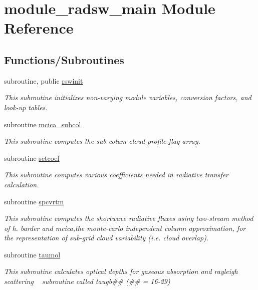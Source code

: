 \hypertarget{namespacemodule__radsw__main}{}\section{module\+\_\+radsw\+\_\+main Module Reference}
\label{namespacemodule__radsw__main}
\subsection*{Functions/\+Subroutines}
\begin{DoxyCompactItemize}
\item 
subroutine, public \hyperlink{group__module__radsw__main_ga9288a5da63d182f20c99e0044ca52f29}{rswinit}
\begin{DoxyCompactList}\small\item\em This subroutine initializes non-\/varying module variables, conversion factors, and look-\/up tables. \end{DoxyCompactList}\item 
subroutine \hyperlink{group__module__radsw__main_gae5916f7b0f63f7836a8ab80ce3933482}{mcica\+\_\+subcol}
\begin{DoxyCompactList}\small\item\em This subroutine computes the sub-\/colum cloud profile flag array. \end{DoxyCompactList}\item 
subroutine \hyperlink{group__module__radsw__main_gaaa580fe228ccc04abd54368c8df0f312}{setcoef}
\begin{DoxyCompactList}\small\item\em This subroutine computes various coefficients needed in radiative transfer calculation. \end{DoxyCompactList}\item 
subroutine \hyperlink{group__module__radsw__main_gae30ee993080f035f0e05cda7c7baffce}{spcvrtm}
\begin{DoxyCompactList}\small\item\em This subroutine computes the shortwave radiative fluxes using two-\/stream method of h. barder and mcica,the monte-\/carlo independent column approximation, for the representation of sub-\/grid cloud variability (i.\+e. cloud overlap). \end{DoxyCompactList}\item 
subroutine \hyperlink{group__module__radsw__main_gaafef1e054b5103007f57129c07fcba81}{taumol}
\begin{DoxyCompactList}\small\item\em This subroutine calculates optical depths for gaseous absorption and rayleigh scattering ~\newline
 subroutine called taugb\#\# (\#\# = 16-\/29) \end{DoxyCompactList}\end{DoxyCompactItemize}
